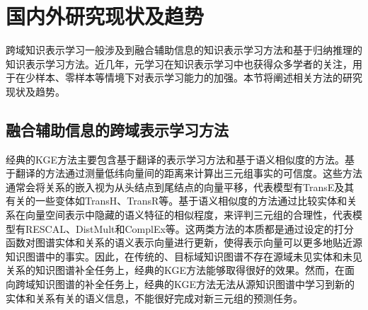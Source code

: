 

\section{国内外研究现状及趋势}
跨域知识表示学习一般涉及到融合辅助信息的知识表示学习方法和基于归纳推理的知识表示学习方法。近几年，元学习在知识表示学习中也获得众多学者的关注，用于在少样本、零样本等情境下对表示学习能力的加强。本节将阐述相关方法的研究现状及趋势。

\subsection{融合辅助信息的跨域表示学习方法}
经典的KGE方法主要包含基于翻译的表示学习方法和基于语义相似度的方法。基于翻译的方法通过测量低纬向量间的距离来计算出三元组事实的可信度。这些方法通常会将关系的嵌入视为从头结点到尾结点的向量平移，代表模型有TransE及其有关的一些变体如TransH\cite{wang2014knowledge}、TransR\cite{lin2015learning}等。基于语义相似度的方法通过比较实体和关系在向量空间表示中隐藏的语义特征的相似程度，来评判三元组的合理性，代表模型有RESCAL、DistMult和ComplEx等。这两类方法的本质都是通过设定的打分函数对图谱实体和关系的语义表示向量进行更新，使得表示向量可以更多地贴近源知识图谱中的事实。因此，在传统的、目标域知识图谱不存在源域未见实体和未见关系的知识图谱补全任务上，经典的KGE方法能够取得很好的效果。然而，在面向跨域知识图谱的补全任务上，经典的KGE方法无法从源知识图谱中学习到新的实体和关系有关的语义信息，不能很好完成对新三元组的预测任务。

